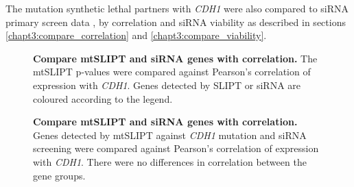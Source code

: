 The mutation synthetic lethal partners with \textit{CDH1} were also compared to siRNA primary screen data \citep{Telford2015}, by correlation and siRNA viability as described in sections \ref{chapt3:compare_correlation} and \ref{chapt3:compare_viability}.

\begin{figure}[!htp]
\begin{mdframed}
\begin{center}
   \end{center}
   \caption[Compare mtSLIPT and siRNA genes with correlation]{\small \textbf{Compare mtSLIPT and siRNA genes with correlation.} The mtSLIPT p-values were compared against Pearson's correlation of expression with \textit{CDH1}. Genes detected by SLIPT or siRNA are coloured according to the legend. 
}
\label{fig:compare_points_correlation_mtSL}
\end{mdframed}

\begin{mdframed}
\begin{center}
   \end{center}
   \caption[Compare mtSLIPT and siRNA genes with correlation]{\small \textbf{Compare mtSLIPT and siRNA genes with correlation.}  Genes detected by mtSLIPT against \textit{CDH1} mutation and siRNA screening were compared against Pearson's correlation of expression with \textit{CDH1}. There were no differences in correlation between the gene groups. 
}
\label{fig:compare_correlation_mtSL}
\end{mdframed}
\end{figure}

